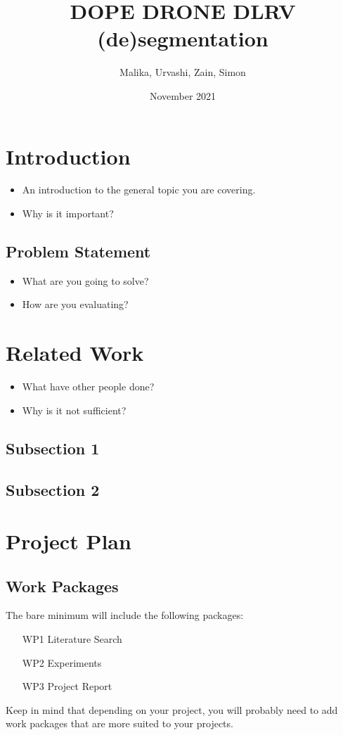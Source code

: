 \documentclass[rnd]{mas_proposal}
\title{DOPE DRONE DLRV (de)segmentation}
\author{Malika, Urvashi, Zain, Simon}
\date{November 2021}
\begin{document}
\maketitle

\pagestyle{plain}

\section{Introduction}
\begin{itemize}
    \item An introduction to the general topic you are covering.
    \item Why is it important?
\end{itemize}

\subsection{Problem Statement}
\begin{itemize}
    \item What are you going to solve?
    \item How are you evaluating?
\end{itemize}


\section{Related Work}
\begin{itemize}
    \item What have other people done?
    \item Why is it not sufficient?
\end{itemize}

\subsection{Subsection 1}
\subsection{Subsection 2}



\section{Project Plan}

\subsection{Work Packages}
The bare minimum will include the following packages:
\begin{enumerate}
    \item[WP1] Literature Search
    \item[WP2] Experiments
    \item[WP3] Project Report
\end{enumerate}
Keep in mind that depending on your project, you will probably need to add work packages that are more suited to your projects.
\end{document}
